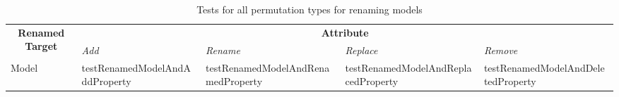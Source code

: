 \newpage
\begin{landscape}
		\thispagestyle{empty}
\begin{table}[ht]
	\begin{center}
	\begin{tabular}{@{}lp{}p{}p{}p{}@{}}
		\toprule
		\multicolumn{1}{c}{\multirow{2}{0.1\textwidth}{\textbf{Renamed Target}}} & \multicolumn{4}{c}{\textbf{Attribute}}                              \\ \cmidrule(l){2-5} 
		\multicolumn{1}{c}{}                                         & \textit{Add} & \textit{Rename} & \textit{Replace} & \textit{Remove} \\ \cmidrule(r){1-1}
		Model                                                        &  testRenamed\-ModelAnd\-AddProperty            &       testRenamed\-ModelAnd\-RenamedProperty          &       testRenamed\-ModelAnd\-ReplacedProperty           &      testRenamed\-ModelAnd\-DeletedProperty           \\ \bottomrule
	\end{tabular}
	\caption{Tests for all permutation types for renaming models}
	\label{tab:PermutationModelTests}
\end{center}
\end{table}
\end{landscape}